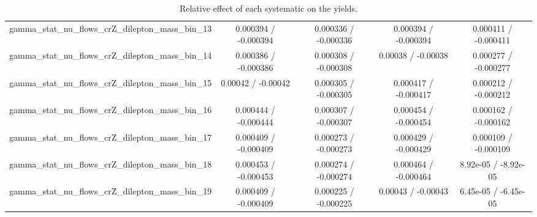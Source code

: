 \documentclass[10pt]{article}
\begin{document}
\begin{table}[htbp]
\begin{center}
\begin{tabular}{|c|c|c|c|c|}
  gamma_stat_nu_flows_crZ_dilepton_mass_bin_13 & 0.000394 / -0.000394 & 0.000336 / -0.000336 & 0.000394 / -0.000394 & 0.000411 / -0.000411 \\ 
  gamma_stat_nu_flows_crZ_dilepton_mass_bin_14 & 0.000386 / -0.000386 & 0.000308 / -0.000308 & 0.00038 / -0.00038 & 0.000277 / -0.000277 \\ 
  gamma_stat_nu_flows_crZ_dilepton_mass_bin_15 & 0.00042 / -0.00042 & 0.000305 / -0.000305 & 0.000417 / -0.000417 & 0.000212 / -0.000212 \\ 
  gamma_stat_nu_flows_crZ_dilepton_mass_bin_16 & 0.000444 / -0.000444 & 0.000307 / -0.000307 & 0.000454 / -0.000454 & 0.000162 / -0.000162 \\ 
  gamma_stat_nu_flows_crZ_dilepton_mass_bin_17 & 0.000409 / -0.000409 & 0.000273 / -0.000273 & 0.000429 / -0.000429 & 0.000109 / -0.000109 \\ 
  gamma_stat_nu_flows_crZ_dilepton_mass_bin_18 & 0.000453 / -0.000453 & 0.000274 / -0.000274 & 0.000464 / -0.000464 & 8.92e-05 / -8.92e-05 \\ 
  gamma_stat_nu_flows_crZ_dilepton_mass_bin_19 & 0.000409 / -0.000409 & 0.000225 / -0.000225 & 0.00043 / -0.00043 & 6.45e-05 / -6.45e-05 \\ 
\hline 
\end{tabular} 
\caption{Relative effect of each systematic on the yields.} 
\end{center} 
\end{table} 
\end{document}
